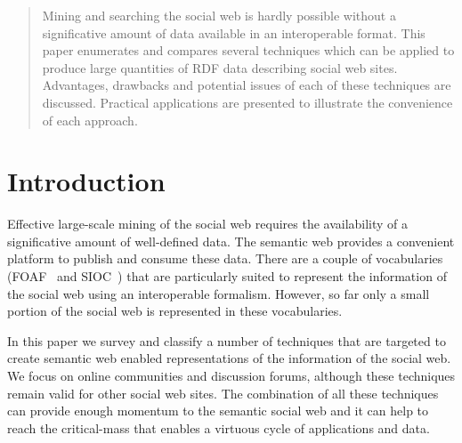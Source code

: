 \documentclass{../templates/www2008-submission}
\begin{document}


\maketitle

\begin{abstract}
Mining and searching the social web is hardly possible without
a significative amount of data available in an interoperable
format. This paper enumerates and compares several techniques which can be
applied to produce large quantities of RDF data describing
social web sites. Advantages, drawbacks and potential issues of
each of these techniques are discussed. Practical applications
are presented to illustrate the convenience of each approach.
\end{abstract}



\section{Introduction}

Effective large-scale mining of the social web requires the
availability of a significative amount of well-defined data.
The semantic web provides a convenient platform to publish and
consume these data. There are a couple of vocabularies (FOAF~\cite{FOAF} and
SIOC~\cite{Bojars2007}) that are particularly suited to represent the
information of the social web using an interoperable formalism.
However, so far only a small portion of the social web is
represented in these vocabularies.

In this paper we survey and classify a number of techniques that
are targeted to create semantic web enabled representations of
the information of the social web. We focus on online communities
and discussion forums, although these techniques remain valid
for other social web sites. The combination of all these
techniques can provide enough momentum to the semantic social
web and it can help to reach the critical-mass that
enables a virtuous cycle of applications and data.
\end{document}
